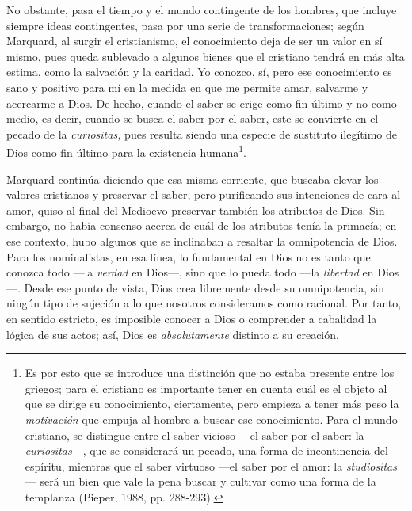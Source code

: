 \begin{refsection}
No obstante, pasa el tiempo y el mundo contingente de los hombres, que incluye siempre ideas contingentes, pasa por una serie de transformaciones; según Marquard, al surgir el cristianismo, el conocimiento deja de ser un valor en sí mismo, pues queda sublevado a algunos bienes que el cristiano tendrá en más alta estima, como la salvación y la caridad. Yo conozco, sí, pero ese conocimiento es sano y positivo para mí en la medida en que me permite amar, salvarme y acercarme a Dios. De hecho, cuando el saber se erige como fin último y no como medio, es decir, cuando se busca el saber por el saber, este se convierte en el pecado de la \emph{curiositas,} pues resulta siendo una especie de sustituto ilegítimo de Dios como fin último para la existencia humana\footnote{Es por esto que se introduce una distinción que no estaba presente entre los griegos; para el cristiano es importante tener en cuenta cuál es el objeto al que se dirige su conocimiento, ciertamente, pero empieza a tener más peso la \emph{motivación} que empuja al hombre a buscar ese conocimiento. Para el mundo cristiano, se distingue entre el saber vicioso ---el saber por el saber: la \emph{curiositas}---, que se considerará un pecado, una forma de incontinencia del espíritu, mientras que el saber virtuoso ---el saber por el amor: la \emph{studiositas}--- será un bien que vale la pena buscar y cultivar como una forma de la templanza (Pieper, 1988, pp. 288-293).}.

Marquard continúa diciendo que esa misma corriente, que buscaba elevar los valores cristianos y preservar el saber, pero purificando sus intenciones de cara al amor, quiso al final del Medioevo preservar también los atributos de Dios. Sin embargo, no había consenso acerca de cuál de los atributos tenía la primacía; en ese contexto, hubo algunos que se inclinaban a resaltar la omnipotencia de Dios. Para los nominalistas, en esa línea, lo fundamental en Dios no es tanto que conozca todo ---la \emph{verdad} en Dios---, sino que lo pueda todo ---la \emph{libertad} en Dios---. Desde ese punto de vista, Dios crea libremente desde su omnipotencia, sin ningún tipo de sujeción a lo que nosotros consideramos como racional. Por tanto, en sentido estricto, es imposible conocer a Dios o comprender a cabalidad la lógica de sus actos; así, Dios es \emph{absolutamente} distinto a su creación.


\end{refsection}
